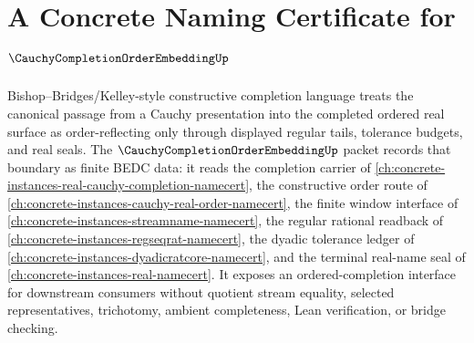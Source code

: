 \chapter{A Concrete Naming Certificate for $\CauchyCompletionOrderEmbeddingUp$}
\label{ch:concrete-instances-cauchy-completion-order-embedding-namecert}

Bishop--Bridges/Kelley-style constructive completion language treats the canonical passage from a Cauchy presentation into the completed ordered real surface as order-reflecting only through displayed regular tails, tolerance budgets, and real seals. The $\CauchyCompletionOrderEmbeddingUp$ packet records that boundary as finite BEDC data: it reads the completion carrier of \autoref{ch:concrete-instances-real-cauchy-completion-namecert}, the constructive order route of \autoref{ch:concrete-instances-cauchy-real-order-namecert}, the finite window interface of \autoref{ch:concrete-instances-streamname-namecert}, the regular rational readback of \autoref{ch:concrete-instances-regseqrat-namecert}, the dyadic tolerance ledger of \autoref{ch:concrete-instances-dyadicratcore-namecert}, and the terminal real-name seal of \autoref{ch:concrete-instances-real-namecert}. It exposes an ordered-completion interface for downstream consumers without quotient stream equality, selected representatives, trichotomy, ambient completeness, Lean verification, or bridge checking.

